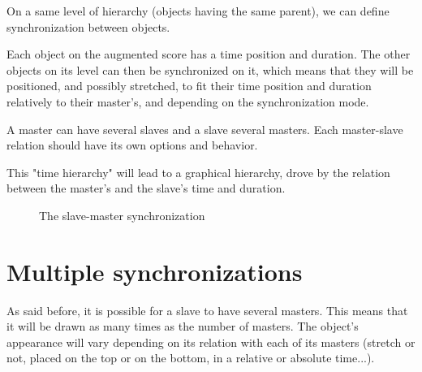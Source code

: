\documentclass[a4paper]{article}
\begin{document}
On a same level of hierarchy (objects having the same parent), we can define synchronization between objects. 

Each object on the augmented score has a time position and duration. The other objects on its level can then be synchronized on it, which means that they will be positioned, and possibly stretched, to fit their time position and duration relatively to their master's, and depending on the synchronization mode.

A master can have several slaves and a slave several masters. Each master-slave relation should have its own options and behavior.

This "time hierarchy" will lead to a graphical hierarchy, drove by the relation between the master's and the slave's time and duration.

\begin{figure}[h]
\begin{center}


 \caption{The slave-master synchronization}
 \label{fig:sync}

\end{center}
\end{figure}


\section{Multiple synchronizations}\label{sec:multSync}

As said before, it is possible for a slave to have several masters. This means that it will be drawn as many times as the number of masters. The object's appearance will vary depending on its relation with each of its masters (stretch or not, placed on the top or on the bottom, in a relative or absolute time...).
\end{document}
